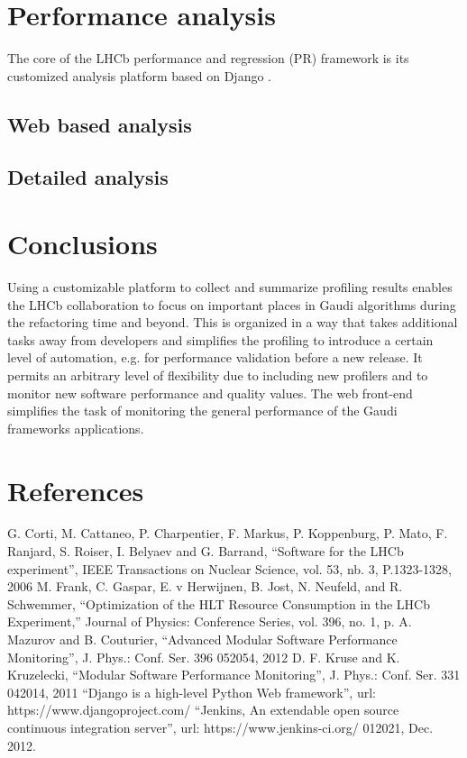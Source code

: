 \documentclass[a4paper]{jpconf}
\begin{document}
\section{Performance analysis}
\label{sec:performance_analysis}

The core of the LHCb performance and regression (PR) framework is its customized analysis platform based on Django \cite{django}.

\subsection{Web based analysis}
\label{sec:web_based_analysis}

\subsection{Detailed analysis}
\label{sec:detailed_analysis}

\section{Conclusions}
\label{sec:conclusions}

Using a customizable platform to collect and summarize profiling results enables the LHCb collaboration to focus on important places in Gaudi algorithms during the refactoring time and beyond. This is organized in a way that takes additional tasks away from developers and simplifies the profiling to introduce a certain level of automation, e.g. for performance validation before a new release. It permits an arbitrary level of flexibility due to including new profilers and to monitor new software performance and quality values. The web front-end simplifies the task of monitoring the general performance of the Gaudi frameworks applications. 

\section*{References}
\begin{thebibliography}{3}
 G. Corti, M. Cattaneo, P. Charpentier, F. Markus, P. Koppenburg, P. Mato, F. Ranjard, S. Roiser, I. Belyaev and G. Barrand, ``Software for the LHCb experiment'', IEEE Transactions on Nuclear Science, vol. 53, nb. 3, P.1323-1328, 2006
M. Frank, C. Gaspar, E. v Herwijnen, B. Jost, N. Neufeld, and R. Schwemmer, “Optimization of the HLT Resource Consumption in the LHCb Experiment,” Journal of Physics: Conference Series, vol. 396, no. 1, p. 
 A. Mazurov and B. Couturier, ``Advanced Modular Software Performance Monitoring'', J. Phys.: Conf. Ser. 396 052054, 2012
 D. F. Kruse and K. Kruzelecki, ``Modular Software Performance Monitoring'', J. Phys.: Conf. Ser. 331 042014, 2011
 ``Django is a high-level Python Web framework'', url: https://www.djangoproject.com/
 ``Jenkins, An extendable open source continuous integration server'', url: https://www.jenkins-ci.org/
012021, Dec. 2012.

\end{thebibliography}
\end{document}
